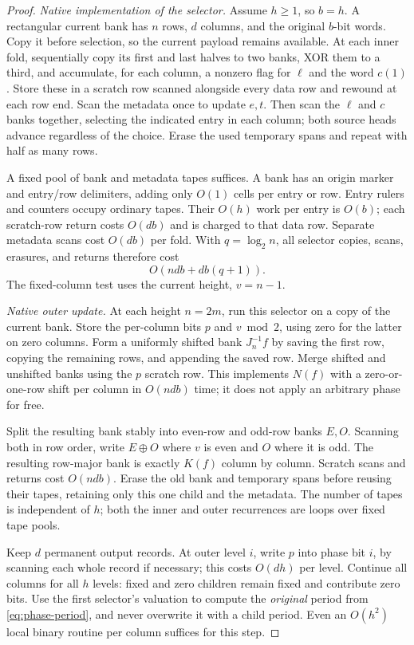 \begin{proof}
\emph{Native implementation of the selector.}
Assume $h\ge1$, so $b=h$. A rectangular current bank has $n$ rows,
$d$ columns, and the original $b$-bit words. Copy it before selection,
so the current payload remains available. At each inner fold, sequentially
copy its first and last halves to two banks, XOR them to a third, and
accumulate, for each column, a nonzero flag for $\ell$ and the word
$c(1)$. Store these in a scratch row scanned alongside every data row
and rewound at each row end. Scan the metadata once to update $e,t$.
Then scan the $\ell$ and $c$ banks together, selecting the indicated
entry in each column; both source heads advance regardless of the choice.
Erase the used temporary spans and repeat with half as many rows.

A fixed pool of bank and metadata tapes suffices. A bank has an origin
marker and entry/row delimiters, adding only $O(1)$ cells per entry or
row. Entry rulers and counters occupy ordinary tapes. Their $O(h)$ work
per entry is $O(b)$; each scratch-row return costs $O(db)$ and is charged
to that data row. Separate metadata scans cost $O(db)$ per fold. With
$q=\log_2 n$, all selector copies, scans, erasures, and returns therefore
cost
\begin{equation}\label{eq:phase-selector-cost}
 O(ndb+db(q+1)).
\end{equation}
The fixed-column test uses the current height, $v=n-1$.

\emph{Native outer update.}
At each height $n=2m$, run this selector on a copy of the current bank.
Store the per-column bits $p$ and $v\bmod2$, using zero for the latter
on zero columns. Form a uniformly shifted bank $J_n^{-1}f$ by saving
the first row, copying the remaining rows, and appending the saved row.
Merge shifted and unshifted banks using the $p$ scratch row. This
implements $N(f)$ with a zero-or-one-row shift per column in $O(ndb)$
time; it does not apply an arbitrary phase for free.

Split the resulting bank stably into even-row and odd-row banks $E,O$.
Scanning both in row order, write $E\oplus O$ where $v$ is even and
$O$ where it is odd. The resulting row-major bank is exactly $K(f)$
column by column. Scratch scans and returns cost $O(ndb)$. Erase the
old bank and temporary spans before reusing their tapes, retaining only
this one child and the metadata. The number of tapes is independent of
$h$; both the inner and outer recurrences are loops over fixed tape pools.

Keep $d$ permanent output records. At outer level $i$, write $p$ into
phase bit $i$, by scanning each whole record if necessary; this costs
$O(dh)$ per level. Continue all columns for all $h$ levels: fixed and
zero children remain fixed and contribute zero bits. Use the first
selector's valuation to compute the \emph{original} period from
\cref{eq:phase-period}, and never overwrite it with a child period.
Even an $O(h^2)$ local binary routine per column suffices for this step.


\end{proof}
